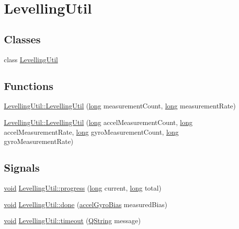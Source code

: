 \hypertarget{group___levelling_util}{\section{Levelling\-Util}
\label{group___levelling_util}
}
\subsection*{Classes}
\begin{DoxyCompactItemize}
\item 
class \hyperlink{class_levelling_util}{Levelling\-Util}
\end{DoxyCompactItemize}
\subsection*{Functions}
\begin{DoxyCompactItemize}
\item 
\hyperlink{group___levelling_util_ga01074f8582e6874acc1a566e55f30b53}{Levelling\-Util\-::\-Levelling\-Util} (\hyperlink{ioapi_8h_a3c7b35ad9dab18b8310343c201f7b27e}{long} measurement\-Count, \hyperlink{ioapi_8h_a3c7b35ad9dab18b8310343c201f7b27e}{long} measurement\-Rate)
\item 
\hyperlink{group___levelling_util_ga7112024f171b944816a5c7cdeab07642}{Levelling\-Util\-::\-Levelling\-Util} (\hyperlink{ioapi_8h_a3c7b35ad9dab18b8310343c201f7b27e}{long} accel\-Measurement\-Count, \hyperlink{ioapi_8h_a3c7b35ad9dab18b8310343c201f7b27e}{long} accel\-Measurement\-Rate, \hyperlink{ioapi_8h_a3c7b35ad9dab18b8310343c201f7b27e}{long} gyro\-Measurement\-Count, \hyperlink{ioapi_8h_a3c7b35ad9dab18b8310343c201f7b27e}{long} gyro\-Measurement\-Rate)
\end{DoxyCompactItemize}
\subsection*{Signals}
\begin{DoxyCompactItemize}
\item 
\hyperlink{group___u_a_v_objects_plugin_ga444cf2ff3f0ecbe028adce838d373f5c}{void} \hyperlink{group___levelling_util_gab523cee804f97da56e83162210546c36}{Levelling\-Util\-::progress} (\hyperlink{ioapi_8h_a3c7b35ad9dab18b8310343c201f7b27e}{long} current, \hyperlink{ioapi_8h_a3c7b35ad9dab18b8310343c201f7b27e}{long} total)
\item 
\hyperlink{group___u_a_v_objects_plugin_ga444cf2ff3f0ecbe028adce838d373f5c}{void} \hyperlink{group___levelling_util_ga7fde9c70306e392dd49fef6c2f17f983}{Levelling\-Util\-::done} (\hyperlink{structaccel_gyro_bias}{accel\-Gyro\-Bias} measured\-Bias)
\item 
\hyperlink{group___u_a_v_objects_plugin_ga444cf2ff3f0ecbe028adce838d373f5c}{void} \hyperlink{group___levelling_util_gac10890045336d643555fb7bc687e6d0a}{Levelling\-Util\-::timeout} (\hyperlink{group___u_a_v_objects_plugin_gab9d252f49c333c94a72f97ce3105a32d}{Q\-String} message)
\end{DoxyCompactItemize}
